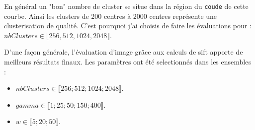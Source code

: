 \documentclass[a4paper, 11pt]{article}
\begin{document}
\begin{center}
\end{center}

En général un "bon" nombre de cluster se situe dans la région du \texttt{coude} de cette courbe. Ainsi les clusters de 200 centres à 2000 centres représente une clusterisation de qualité. C'est pourquoi j'ai choisis de faire les évaluations pour :
$nbClusters \in \llbracket  256,512,1024,2048 \rrbracket$.


D'une façon générale, l'évaluation d'image grâce aux calculs de sift apporte de  meilleurs résultats finaux.
Les paramètres ont été selectionnés dans les ensembles :
\begin{itemize}
 \item $nbClusters \in \llbracket  256;512;1024;2048 \rrbracket$.
 \item $gamma \in \llbracket  1;25;50;150;400 \rrbracket$.
  \item $w \in \llbracket  5;20;50 \rrbracket$.
\end{itemize}
\end{document}
